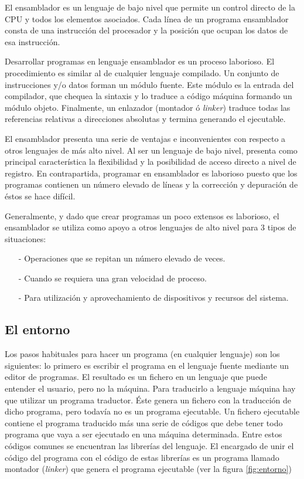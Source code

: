 El ensamblador es un lenguaje de bajo nivel que permite un control
directo de la CPU y todos los elementos asociados. Cada línea de un
programa ensamblador consta de una instrucción del procesador y la
posición que ocupan los datos de esa instrucción.

Desarrollar programas en lenguaje ensamblador es un proceso laborioso.
El procedimiento es similar al de cualquier lenguaje compilado.
Un conjunto de instrucciones y/o datos forman un módulo fuente.
Este módulo es la entrada del compilador, que chequea la sintaxis y lo
traduce a código máquina formando un módulo objeto.
Finalmente, un enlazador (montador ó {\it linker}) traduce todas las
referencias relativas a direcciones absolutas y termina generando el
ejecutable.

El ensamblador presenta una serie de ventajas e inconvenientes con
respecto a otros lenguajes de más alto nivel. Al ser un lenguaje de
bajo nivel, presenta como principal característica la flexibilidad y
la posibilidad de acceso directo a nivel de registro. En
contrapartida, programar en ensamblador es laborioso puesto que los
programas contienen un número elevado de líneas y la corrección y
depuración de éstos se hace difícil.

Generalmente, y dado que crear programas un poco extensos es
laborioso, el ensamblador se utiliza como apoyo a otros lenguajes
de alto nivel para 3 tipos de situaciones:
\begin{itemize}
     \item[-] Operaciones que se repitan un número elevado de veces.
     \item[-] Cuando se requiera una gran velocidad de proceso.
     \item[-] Para utilización y aprovechamiento de dispositivos y
     recursos del sistema.
\end{itemize}

\subsection{El entorno}

Los pasos habituales para hacer un programa (en cualquier lenguaje) son 
los siguientes:
lo primero es escribir el programa en el lenguaje fuente
mediante un editor de programas.
El resultado es un fichero en un lenguaje que puede entender el usuario,
pero no la máquina.
Para traducirlo a lenguaje máquina hay que utilizar un programa traductor.
Éste genera un fichero con la traducción de dicho programa, pero todavía
no es un programa ejecutable.
Un fichero ejecutable contiene el programa traducido más una serie de
códigos que debe tener todo programa que vaya a ser ejecutado en una
máquina determinada.
Entre estos códigos comunes se encuentran las librerías del lenguaje.
El encargado de unir el código del programa con el código de estas
librerías es un programa llamado montador ({\it linker}) que genera el
programa ejecutable (ver la figura \ref{fig:entorno})

